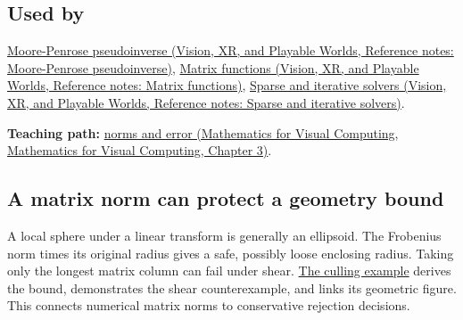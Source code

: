 \subsection{Used by}\label{appendix-f8657bac66e5-used-by}

\href{../07-Vision-XR-and-Playable-Worlds/main.pdf\#nameddest=appendix-541306fdbc1b}{Moore-Penrose pseudoinverse (Vision, XR, and Playable Worlds, Reference notes: Moore-Penrose pseudoinverse)}, \href{../07-Vision-XR-and-Playable-Worlds/main.pdf\#nameddest=appendix-0f4bc2bf2b1f}{Matrix functions (Vision, XR, and Playable Worlds, Reference notes: Matrix functions)}, \href{../07-Vision-XR-and-Playable-Worlds/main.pdf\#nameddest=appendix-67c87a3d9e94}{Sparse and iterative solvers (Vision, XR, and Playable Worlds, Reference notes: Sparse and iterative solvers)}.

\textbf{Teaching path:} \href{../02-Mathematics-for-Visual-Computing/main.pdf\#nameddest=01-foundations-i-ch019-matrix-norms-give-scale-to-residuals-and-error-claims}{norms and error (Mathematics for Visual Computing, Mathematics for Visual Computing, Chapter 3)}.

\subsection{A matrix norm can protect a geometry bound}\label{appendix-f8657bac66e5-a-matrix-norm-can-protect-a-geometry-bound}

A local sphere under a linear transform is generally an ellipsoid. The Frobenius norm times its original radius gives a safe, possibly loose enclosing radius. Taking only the longest matrix column can fail under shear. \hyperref[04-visual-computing-ii-ch028-a-line-corridor-can-be-a-cheap-prefilter-for-shadow-caster-work]{The culling example} derives the bound, demonstrates the shear counterexample, and links its geometric figure. This connects numerical matrix norms to conservative rejection decisions.

